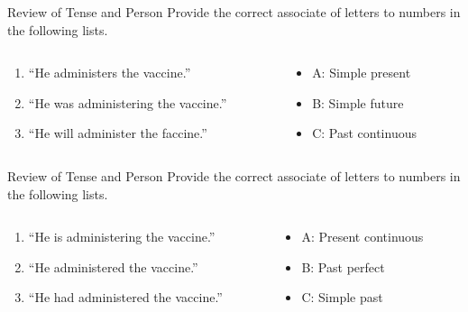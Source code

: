 \documentclass{beamer}
\begin{document}
\begin{frame}{Review of Tense and Person}
\small
\alert{Provide the correct associate of letters to numbers in the following lists.}
\begin{columns}[T]
\begin{column}{0.5\textwidth}
\begin{enumerate}
\item ``He administers the vaccine.''
\item ``He was administering the vaccine.''
\item ``He will administer the faccine.''
\end{enumerate}
\end{column}
\begin{column}{0.5\textwidth}
\begin{itemize}
\item A: Simple present
\item B: Simple future
\item C: Past continuous
\end{itemize}
\end{column}
\end{columns}
\end{frame}

\begin{frame}{Review of Tense and Person}
\small
\alert{Provide the correct associate of letters to numbers in the following lists.}
\begin{columns}[T]
\begin{column}{0.5\textwidth}
\begin{enumerate}
\item ``He is administering the vaccine.''
\item ``He administered the vaccine.''
\item ``He had administered the vaccine.''
\end{enumerate}
\end{column}
\begin{column}{0.5\textwidth}
\begin{itemize}
\item A: Present continuous
\item B: Past perfect
\item C: Simple past
\end{itemize}
\end{column}
\end{columns}
\end{frame}
\end{document}
